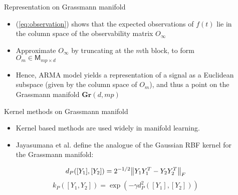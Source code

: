 \documentclass[final]{beamer}
\newlength{\sepwid}
\newlength{\onecolwid}
\begin{document}
\begin{frame}[t]
\begin{columns}[t]
\begin{column}{\onecolwid}
\end{column} %

\begin{column}{\sepwid}\end{column} %

\begin{column}{\onecolwid} %


\begin{block}{Representation on Grassmann manifold}
    \begin{itemize}
        \item (\ref{eq:observation}) shows that the expected observations of $f(t)$ lie in the
            column space of the observability matrix $O_\infty$

        \item Approximate $O_\infty$ by truncating at the $m$th block, to form $O_m \in
            \mathsf{M}_{mp \times d}$

        \item Hence, ARMA model yields a representation of a signal as a Euclidean subspace (given
            by the column space of $O_m$), and thus a point on the Grassmann manifold
            $\textbf{Gr}(d, mp)$
    \end{itemize}
\end{block}


\begin{block}{Kernel methods on Grassmann manifold}
    \begin{itemize}
        
        \item Kernel based methods are used widely in manifold learning.

        \item Jayasumana et al. \cite{jayasumana_kernel_2015} define the analogue of the Gaussian RBF kernel for  the
            Grassmann manifold:

            \begin{equation}
                d_P([Y_1], [Y_2]) = 2^{-1/2} \norm{Y_1Y_1^T - Y_2Y_2^T}_F
            \end{equation}
            \begin{equation}\label{eq:kernel}
                k_P([Y_1, Y_2]) = \exp(-\gamma d_P^2([Y_1], [Y_2]))
            \end{equation}


\end{itemize}
\end{block}
\end{column}
\end{columns}
\end{frame}
\end{document}
